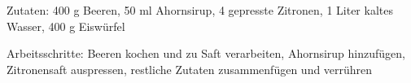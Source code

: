Zutaten:
400 g Beeren, 50 ml Ahornsirup, 4 gepresste Zitronen, 1 Liter kaltes Wasser, 400 g Eiswürfel

\noindent Arbeitsschritte: Beeren kochen und zu Saft verarbeiten, Ahornsirup hinzufügen, Zitronensaft auspressen, restliche Zutaten zusammenfügen und verrühren